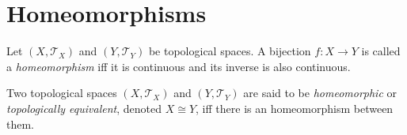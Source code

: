 \section{Homeomorphisms}


\begin{definition}
	[homeomorphisms]
	\label{def: homomorphisms}
	Let $(X, \mathcal T_X)$ and $(Y, \mathcal T_Y)$ be topological spaces. A bijection $f: X \to Y$ is called a \textit{homeomorphism} iff it is continuous and its inverse is also continuous.
\end{definition}


\begin{definition}
	[homeomorphic]
	\label{def: homomorphisms}
	Two topological spaces $(X, \mathcal T_X)$ and $(Y, \mathcal T_Y)$ are said to be \textit{homeomorphic} or \textit{topologically equivalent}, denoted $X \cong Y$, iff there is an homeomorphism between them.
\end{definition}
